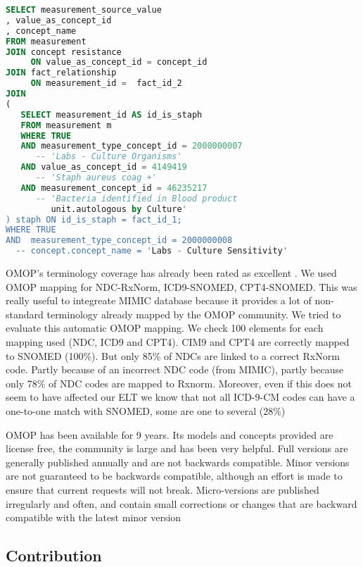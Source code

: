 \begin{lstlisting}[language=sql,basicstyle=\scriptsize,caption=Original table microbiology SQL query,label={lst:original}]
SELECT measurement_source_value
, value_as_concept_id
, concept_name
FROM measurement
JOIN concept resistance 
     ON value_as_concept_id = concept_id
JOIN fact_relationship 
     ON measurement_id =  fact_id_2
JOIN
(
   SELECT measurement_id AS id_is_staph
   FROM measurement m
   WHERE TRUE 
   AND measurement_type_concept_id = 2000000007        			
      -- 'Labs - Culture Organisms'
   AND value_as_concept_id = 4149419                     			
      -- 'Staph aureus coag +' 
   AND measurement_concept_id = 46235217               			
      -- 'Bacteria identified in Blood product 
         unit.autologous by Culture'
) staph ON id_is_staph = fact_id_1;
WHERE TRUE
AND  measurement_type_concept_id = 2000000008        			        
  -- concept.concept_name = 'Labs - Culture Sensitivity'
\end{lstlisting}


OMOP's terminology coverage has already been rated as excellent \cite{omop-vs-pcornet}. 
We used OMOP mapping for NDC-RxNorm, ICD9-SNOMED, CPT4-SNOMED. 
This was really useful to integreate MIMIC database because it provides a lot 
of non-standard terminology already mapped by the OMOP community. 
We tried to evaluate this automatic OMOP mapping. We check 100 elements for each 
mapping used (NDC, ICD9 and CPT4). CIM9 and CPT4 are correctly mapped to SNOMED 
(100\%). But only 85\% of NDCs are linked to a correct RxNorm code. 
Partly because of an incorrect NDC code (from MIMIC), partly because only 78\% 
of NDC codes are mapped to Rxnorm. Moreover, even if this does not seem to have 
affected our ELT we know that not all ICD-9-CM codes can have a one-to-one match 
with SNOMED, some are one to several (28\%) \cite{snomed-icd9}
 
OMOP has been available for 9 years. Its models and concepts provided are 
license free, the community is large and has been very helpful. Full versions 
are generally published annually and are not backwards compatible. 
Minor versions are not guaranteed to be backwards compatible, although an effort 
is made to ensure that current requests will not break. Micro-versions are 
published irregularly and often, and contain small corrections or changes 
that are backward compatible with the latest minor version \cite{omop-cdm}

%
%
\subsection{Contribution}

